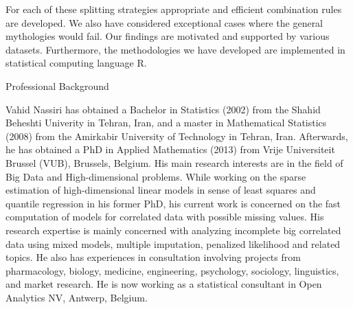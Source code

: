 \documentclass[14pt]{article}
\begin{document}
For each of these splitting strategies appropriate and efficient combination rules are developed. We also have considered exceptional cases where the general mythologies would fail. Our findings are motivated and supported by various datasets. Furthermore, the methodologies we have developed are implemented in statistical computing language R.
\vspace{1cm}
\begin{center}
{\large{Professional Background}}
\end{center}
\vspace{0.5cm}
Vahid Nassiri  has obtained a Bachelor in Statistics (2002) from the Shahid Beheshti Univerity in Tehran, Iran, and a master in Mathematical Statistics (2008) from the Amirkabir University of Technology in Tehran, Iran. Afterwards, he has obtained a PhD in Applied Mathematics (2013) from Vrije Universiteit Brussel (VUB), Brussels, Belgium. His main research interests are in the field of Big Data and High-dimensional problems. While working on the sparse estimation of high-dimensional linear models in sense of least squares and quantile regression in his former PhD, his current work is concerned on the fast computation of models for correlated data with possible missing values. His research expertise is mainly concerned with analyzing incomplete big correlated data using mixed models, multiple imputation, penalized likelihood and related topics. He also has experiences in consultation involving projects from pharmacology, biology, medicine, engineering, psychology, sociology, linguistics, and market research. He is now working as a statistical consultant in Open Analytics NV, Antwerp, Belgium.
\end{document}
